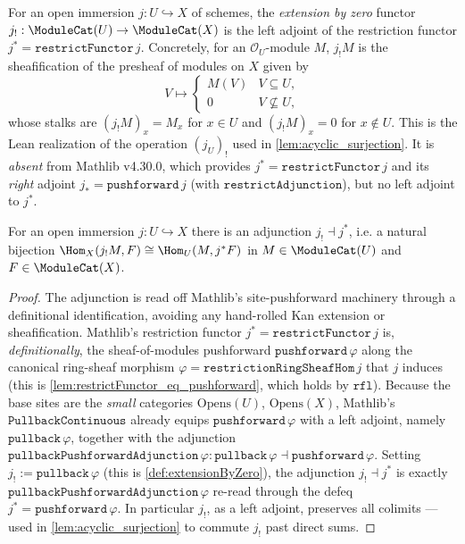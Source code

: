 \begin{definition}
  \label{def:extensionByZero}
  For an open immersion $j : U \hookrightarrow X$ of schemes, the
  \emph{extension by zero} functor
  $j_! : \ModuleCat(U) \to \ModuleCat(X)$ is the left adjoint of the restriction
  functor $j^{*} = \mathtt{restrictFunctor}\,j$. Concretely, for an
  $\mathcal{O}_U$-module $M$, $j_! M$ is the sheafification of the presheaf of
  modules on $X$ given by
  \[
    V \longmapsto
      \begin{cases} M(V) & V \subseteq U,\\[2pt] 0 & V \not\subseteq U,\end{cases}
  \]
  whose stalks are $(j_! M)_x = M_x$ for $x \in U$ and $(j_! M)_x = 0$ for
  $x \notin U$. This is the Lean realization of the operation $(j_U)_!$ used in
  \cref{lem:acyclic_surjection}. It is \emph{absent} from Mathlib v4.30.0, which
  provides $j^{*} = \mathtt{restrictFunctor}\,j$ and its \emph{right} adjoint
  $j_{*} = \mathtt{pushforward}\,j$ (with $\mathtt{restrictAdjunction}$), but no
  left adjoint to $j^{*}$.
\end{definition}

\begin{lemma}
  \label{lem:extensionByZeroAdjunction}
  For an open immersion $j : U \hookrightarrow X$ there is an adjunction
  $j_! \dashv j^{*}$, i.e. a natural bijection
  $\Hom_X(j_! M, F) \cong \Hom_U(M, j^{*} F)$ in $M \in \ModuleCat(U)$ and
  $F \in \ModuleCat(X)$.
  \begin{proof}
    The adjunction is read off Mathlib's site-pushforward machinery through a
    definitional identification, avoiding any hand-rolled Kan extension or
    sheafification. Mathlib's restriction functor $j^{*} =
    \mathtt{restrictFunctor}\,j$ is, \emph{definitionally}, the sheaf-of-modules
    pushforward $\mathtt{pushforward}\,\varphi$ along the canonical ring-sheaf
    morphism $\varphi = \mathtt{restrictionRingSheafHom}\,j$ that $j$ induces (this
    is \cref{lem:restrictFunctor_eq_pushforward}, which holds by $\mathtt{rfl}$).
    Because the base sites are the \emph{small} categories $\mathrm{Opens}(U)$,
    $\mathrm{Opens}(X)$, Mathlib's $\mathtt{PullbackContinuous}$ already equips
    $\mathtt{pushforward}\,\varphi$ with a left adjoint, namely
    $\mathtt{pullback}\,\varphi$, together with the adjunction
    $\mathtt{pullbackPushforwardAdjunction}\,\varphi :
    \mathtt{pullback}\,\varphi \dashv \mathtt{pushforward}\,\varphi$. Setting
    $j_! := \mathtt{pullback}\,\varphi$ (this is \cref{def:extensionByZero}), the
    adjunction $j_! \dashv j^{*}$ is exactly
    $\mathtt{pullbackPushforwardAdjunction}\,\varphi$ re-read through the defeq
    $j^{*} = \mathtt{pushforward}\,\varphi$. In particular $j_!$, as a left
    adjoint, preserves all colimits — used in \cref{lem:acyclic_surjection} to
    commute $j_!$ past direct sums.
  \end{proof}
\end{lemma}

